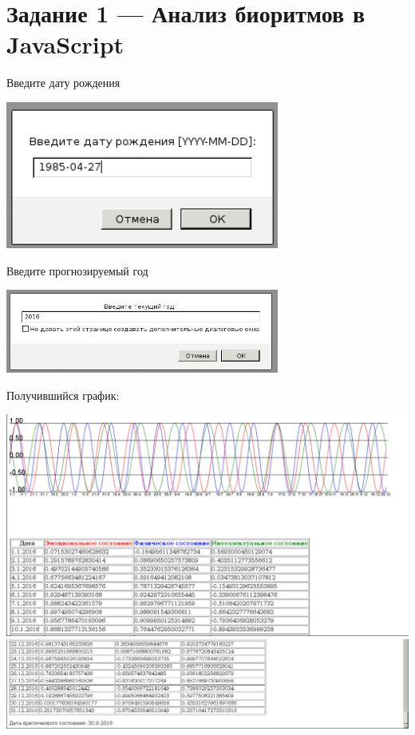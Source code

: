 \section{Задание 1 --- Анализ биоритмов в JavaScript}

Введите дату рождения

\begin{center} 
  \includegraphics[width=9cm]{img/01.png}
\end{center}

Введите прогнозируемый год

\begin{center} 
  \includegraphics[width=9cm]{img/02.png}
\end{center}

Получившийся график:

\begin{center} 
  \includegraphics[width=15cm]{img/03.png}
  \includegraphics[width=15cm]{img/04.png}
\end{center}

